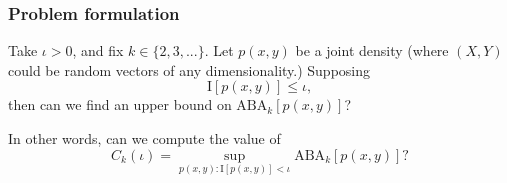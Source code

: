 \documentclass{beamer}
\begin{document}





\begin{frame}
\frametitle{Problem formulation} Take $\iota > 0$, and fix $k \in
\{2,3,...\}$.  Let $p(x, y)$ be a joint density (where $(X, Y)$
could be random vectors of any dimensionality.)  Supposing
\[
\text{I}[p(x, y)] \leq \iota,
\]
then can we find an upper bound on $\text{ABA}_k[p(x, y)]$?

In other words, can we compute the value of
\[
C_k(\iota) = \sup_{p(x, y): \text{I}[p(x, y)] < \iota} \text{ABA}_k[p(x, y)]?
\]
\end{frame}
\end{document}
